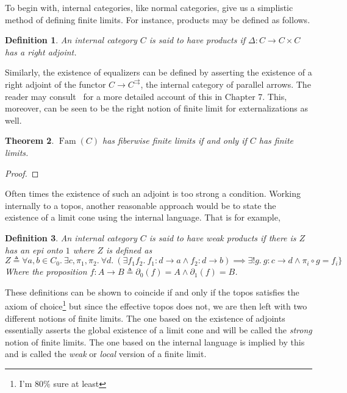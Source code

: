 \documentclass[12pt]{amsart}
\newcommand{\todo}[1]{{\color{red}{\LARGE #1}}}
\DeclareMathOperator{\family}{Fam}
\newtheorem{thm}{Theorem}[section]
\newtheorem{defn}[thm]{Definition}
\begin{document}
To begin with, internal categories, like normal categories, give us a
simplistic method of defining finite limits. For instance, products
may be defined as follows.
\begin{defn}\label{defn:completeness:products}
  An internal category $C$ is said to have products if
  $\Delta : C \to C \times C$ has a right adjoint.
\end{defn}
Similarly, the existence of equalizers can be defined by asserting the
existence of a right adjoint of the functor
$C \to C^{\rightrightarrows}$, the internal category of parallel
arrows. The reader may consult~\citet{Jacobs:99} for a more detailed
account of this in Chapter 7. This, moreover, can be seen to be the
right notion of finite limit for externalizations as well.
\begin{thm}\label{defn:completeness:finlimexternalization}
  $\family(C)$ has fiberwise finite limits if and only if $C$ has
  finite limits.
\end{thm}
\begin{proof}
  \todo{Flesh me out!}
\end{proof}
Often times the existence of such an adjoint is too strong a
condition. Working internally to a topos, another reasonable approach
would be to state the existence of a limit cone using the internal
language. That is for example,
\begin{defn}\label{defn:completeness:weakproducts}
  An internal category $C$ is said to have weak products if there is
  $Z$ has an epi onto $1$ where $Z$ is defined as
  \[
    Z \triangleq \forall a, b \in C_0.\ \exists c, \pi_1, \pi_2.
    \ \forall d.\ (\exists f_1 f_2.\ f_1 : d \to a \mathrel{\wedge} f_2 : d \to b) \implies
    \exists! g.\ g : c \to d \mathrel{\wedge} \pi_i \circ g = f_i\}
  \]
  Where the proposition
  $f : A \to B \triangleq \partial_0(f) = A \mathrel{\wedge} \partial_1(f) = B$.
\end{defn}
These definitions can be shown to coincide if and only if the topos
satisfies the axiom of choice\footnote{I'm 80\% sure at least} but
since the effective topos does not, we are then left with two
different notions of finite limits. The one based on the existence of
adjoints essentially asserts the global existence of a limit cone and
will be called the \emph{strong} notion of finite limits. The one
based on the internal language is implied by this and is called the
\emph{weak} or \emph{local} version of a finite limit.
\end{document}

